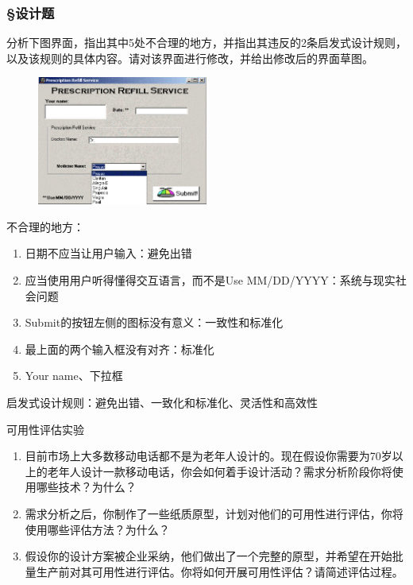 \subsubsection*{\S 设计题}
\setcounter{problemname}{0}

\begin{problem}[2021]
分析下图界面，指出其中5处不合理的地方，并指出其违反的2条启发式设计规则，以及该规则的具体内容。请对该界面进行修改，并给出修改后的界面草图。
\begin{figure}[H]
    \vspace{-0.5em}
	\centering
	\includegraphics[width=0.5\textwidth]{1.png}
    \vspace{-1em}
\end{figure}
\end{problem}

\begin{solution}
不合理的地方：
\begin{enumerate}[label=\arabic*.]
    \item 日期不应当让用户输入：避免出错
    \item 应当使用用户听得懂得交互语言，而不是Use MM/DD/YYYY：系统与现实社会问题
    \item Submit的按钮左侧的图标没有意义：一致性和标准化
    \item 最上面的两个输入框没有对齐：标准化
    \item Your name、下拉框
\end{enumerate}

启发式设计规则：避免出错、一致化和标准化、灵活性和高效性
\end{solution}



\begin{problem}[2021]
可用性评估实验
\begin{enumerate}[label=\arabic*.]
    \item 目前市场上大多数移动电话都不是为老年人设计的。现在假设你需要为70岁以上的老年人设计一款移动电话，你会如何着手设计活动？需求分析阶段你将使用哪些技术？为什么？
    \item 需求分析之后，你制作了一些纸质原型，计划对他们的可用性进行评估，你将使用哪些评估方法？为什么？
    \item 假设你的设计方案被企业采纳，他们做出了一个完整的原型，并希望在开始批量生产前对其可用性进行评估。你将如何开展可用性评估？请简述评估过程。
\end{enumerate}
\end{problem}

